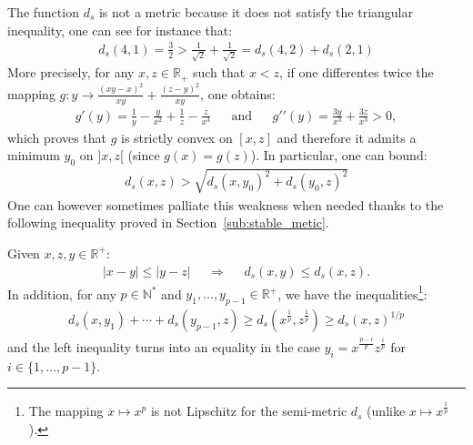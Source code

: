 \documentclass[a4papaer, titlepage]{book}
\begin{document}
The function $d_s$ is not a metric because it does not satisfy the triangular inequality, one can see for instance that:
  \begin{align}\label{eq:triangular_inequality_not_valid}
    d_s(4,1) = \frac{3}{2} > \frac{1}{\sqrt 2} + \frac{1}{\sqrt 2}=d_s(4,2) + d_s(2,1)  
  \end{align}
  More precisely, for any $x,z \in \mathbb R_+$ such that $x<z$, if one differentes twice the mapping $g : y \to \frac{(xy-x)^2}{xy} + \frac{(z-y)^2}{xy}$, one obtains:
   \begin{align*}
     g'(y) = \frac{1}{y}- \frac{y}{x^2} + \frac{1}{z} - \frac{z}{x^3}&
     &\text{and}&
     &g'\!{}'(y) = \frac{3y}{x^3} + \frac{3z}{x^3}>0,
   \end{align*}
  which proves that $g$ is strictly convex on $[x,z]$ and therefore it admits a minimum $y_0$ on $]x,z[$ (since $g(x) = g(z)$). In particular, one can bound:
  \begin{align*}
    d_s(x,z ) > \sqrt{d_s(x,y_0)^2 + d_s(y_0,z)^2}
  \end{align*}
  One can however sometimes palliate this weakness when needed thanks to the following inequality proved in Section~\ref{sub:stable_metic}.
  \begin{proposition}\label{pro:palliation_absence_inegalite_triangulaire}
    Given $x,z,y \in \mathbb R^+$:
    \begin{align*}
        |x-y| \leq |y - z|&
        &\Longrightarrow&
       &d_s(x,y) \leq d_s(x,z).
     \end{align*}
     In addition, for any $p\in \mathbb N^*$ and $y_1,\ldots,y_{p-1} \in \mathbb R^+$, we have the inequalities\footnote{The mapping $x\mapsto x^p$ is not Lipschitz for the semi-metric $d_s$ (unlike $x \mapsto x^{\frac{1}{p}}$).}:
  \begin{align*}
    d_s(x,y_1) + \cdots + d_s(y_{p-1},z) \geq d_s \left(x^{\frac{1}{p}},z^{\frac{1}{p}}\right)
    \geq d_s \left(x,z\right)^{1/p}
  \end{align*}
  and the left inequality turns into an equality in the case $y_i = x^{\frac{p-i}{p}} z^{\frac{i}{p}}$ for $i\in\{1,\ldots,p-1\}$.
  \end{proposition}
  
\end{document}
